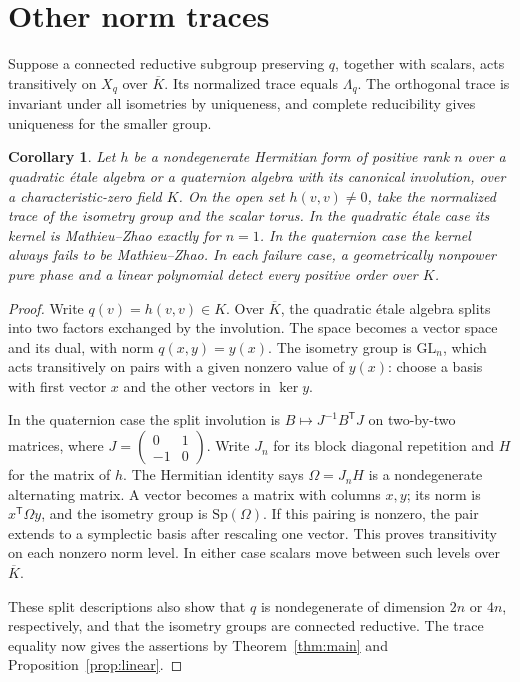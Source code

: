 \documentclass[11pt]{article}
\newtheorem{corollary}[theorem]{Corollary}
\newcommand{\Lq}{\Lambda_q}
\begin{document}
\section{Other norm traces}\label{sec:hermitian}

Suppose a connected reductive subgroup preserving \(q\), together
with scalars, acts transitively on \(X_q\) over \(\overline K\).
Its normalized trace equals \(\Lq\).
The orthogonal trace is invariant under all isometries by uniqueness,
and complete reducibility gives uniqueness for the smaller group.

\begin{corollary}\label{cor:hermitian}
Let \(h\) be a nondegenerate Hermitian form of positive rank \(n\)
over a quadratic \'{e}tale algebra or a quaternion algebra with its
canonical involution, over a characteristic-zero field \(K\).
On the open set \(h(v,v)\ne0\), take the normalized trace of the
isometry group and the scalar torus. In the quadratic \'{e}tale
case its kernel is Mathieu--Zhao exactly for \(n=1\).
In the quaternion case the kernel always fails to be Mathieu--Zhao.
In each failure case, a geometrically nonpower pure phase and a
linear polynomial detect every positive order over \(K\).
\end{corollary}

\begin{proof}
Write \(q(v)=h(v,v)\in K\). Over \(\overline K\), the quadratic
\'{e}tale algebra splits into two factors exchanged by the involution.
The space becomes a vector space and its dual, with norm
\(q(x,y)=y(x)\). The isometry group is \(\mathrm{GL}_n\), which
acts transitively on pairs with a given nonzero value of \(y(x)\):
choose a basis with first vector \(x\) and the other vectors in
\(\ker y\).

In the quaternion case the split involution is
\(B\mapsto J^{-1}B^{\mathsf T}J\) on two-by-two matrices, where
\(J=\left(\begin{smallmatrix}0&1\\-1&0\end{smallmatrix}\right)\).
Write \(J_n\) for its block diagonal repetition and \(H\) for the
matrix of \(h\). The Hermitian identity says
\(\Omega=J_nH\) is a nondegenerate alternating matrix. A vector
becomes a matrix with columns \(x,y\); its norm is
\(x^{\mathsf T}\Omega y\), and the isometry group is
\(\mathrm{Sp}(\Omega)\). If this pairing is nonzero, the pair
extends to a symplectic basis after rescaling one vector.
This proves transitivity on each nonzero norm level.
In either case scalars move between such levels over \(\overline K\).

These split descriptions also show that \(q\) is nondegenerate
of dimension \(2n\) or \(4n\), respectively, and that the isometry
groups are connected reductive. The trace equality now gives the
assertions by Theorem~\ref{thm:main} and
Proposition~\ref{prop:linear}.
\end{proof}
\end{document}
